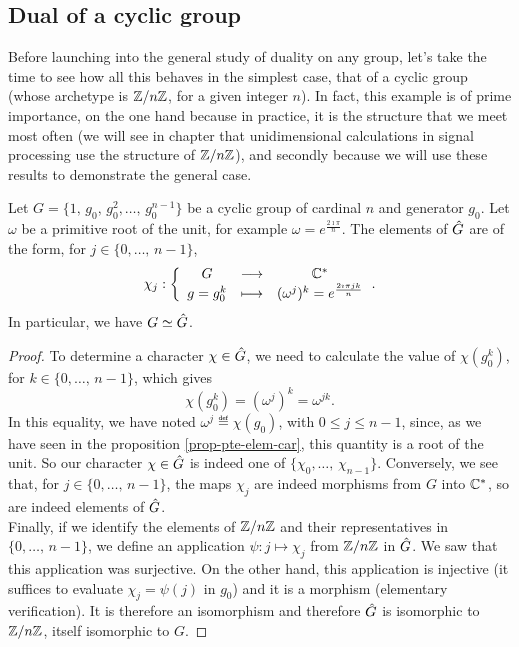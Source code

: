 \subsection{Dual of a cyclic group}
\label{sect1-dual-cyclic-group}


Before launching into the general study of duality on any group, let's take the time to see how all this behaves in the simplest case, that of a cyclic group (whose archetype is $\mathbb{Z}/n\mathbb{Z}$, for a given integer $n$). In fact, this example is of prime importance, on the one hand because in practice, it is the structure that we meet most often (we will see in chapter  that unidimensional calculations in signal processing use the structure of $\mathbb{Z}/n\mathbb{Z}$), and secondly because we will use these results to demonstrate the general case.

\begin{prop}
\label{prop-cyclic-case}
 Let $ G = \{1, \, g_0, \, g_0^2, \ldots, \, g_0^{n-1}\}$ be a cyclic group of cardinal $n$ and generator $ g_0 $. \label{notation-12} Let $\omega $ be a primitive root  of the unit, for example $\omega = e^{\frac{2 \imath \pi}{n}}$. The elements of $\hat{G}$ are of the form, for $ j \in \{0, \ldots, \, n-1\}$,
\begin{equation*}
\chi_j: {\left\{ \begin{array}{ccc} G & \longrightarrow & \mathbb{C}^* \\ g = g_0^k & \longmapsto & (\omega^j)^k = e^{\frac{2 \imath \pi j k}{n}} \end{array} \right.}.
\end{equation*}
\label{notation-13} In particular, we have $ G \simeq \hat{G}$.
\end{prop}
\begin{proof}
To determine a character $\chi \in \hat{G}$, we need to calculate the value of $\chi(g_0^k)$, for $ k \in \{0, \ldots, \, n-1\}$, which gives
\begin{equation*}
\chi(g_0^k) =(\omega^j)^k = \omega^{j k}.
\end{equation*}
In this equality, we have noted $\omega^j \eqdef \chi(g_0)$, with $0 \leq j \leq n-1$, since, as we have seen in the proposition \ref{prop-pte-elem-car}, this quantity is a  root of the unit. So our character $\chi \in \hat{G}$ is indeed one of $\{\chi_0, \ldots, \, \chi_{n-1}\}$. Conversely, we see that, for $ j \in \{0, \ldots, \, n-1\}$, the maps $\chi_j $ are indeed morphisms from $G$ into $\mathbb{C}^*$, so are indeed elements of $\hat{G}$. \\Finally, if we identify the elements of $\mathbb{Z}/n\mathbb{Z}$ and their representatives in $\{0, \ldots, \, n-1\}$, we define an application $\psi: j \mapsto \chi_j $ from $\mathbb{Z}/n\mathbb{Z}$ in $\hat{G}$. We saw that this application was surjective. On the other hand, this application is injective (it suffices to evaluate $\chi_j = \psi (j)$ in $ g_0 $) and it is a morphism (elementary verification). It is therefore an isomorphism and therefore $\hat{G}$ is isomorphic to $\mathbb{Z}/n\mathbb{Z}$, itself isomorphic to $G$.
\end{proof}
